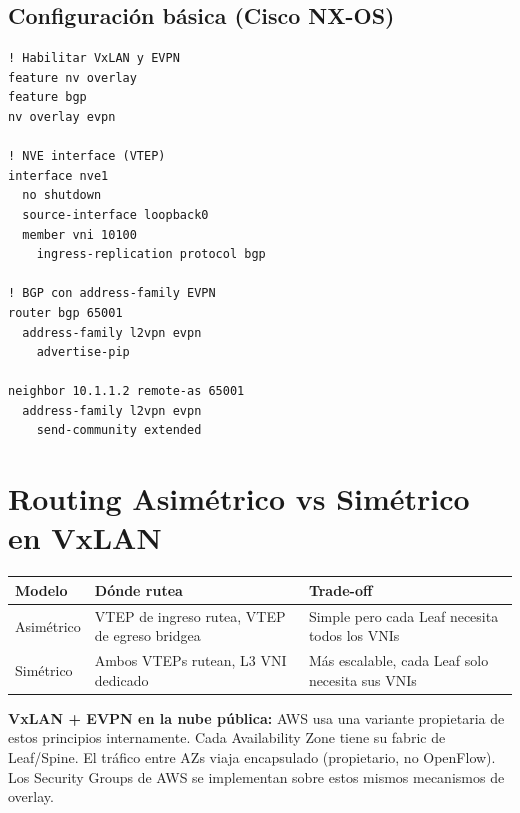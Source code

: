 \subsection{Configuración básica (Cisco NX-OS)}

\begin{codigo}
\begin{lstlisting}
! Habilitar VxLAN y EVPN
feature nv overlay
feature bgp
nv overlay evpn

! NVE interface (VTEP)
interface nve1
  no shutdown
  source-interface loopback0
  member vni 10100
    ingress-replication protocol bgp

! BGP con address-family EVPN
router bgp 65001
  address-family l2vpn evpn
    advertise-pip

neighbor 10.1.1.2 remote-as 65001
  address-family l2vpn evpn
    send-community extended
\end{lstlisting}
\end{codigo}

\section{ Routing Asimétrico vs Simétrico en VxLAN}

\begin{center}
\begin{tabular}{lll}
\toprule
\textbf{Modelo} & \textbf{Dónde rutea} & \textbf{Trade-off} \\
\midrule
Asimétrico & VTEP de ingreso rutea, VTEP de egreso bridgea & Simple pero cada Leaf necesita todos los VNIs \\
Simétrico  & Ambos VTEPs rutean, L3 VNI dedicado           & Más escalable, cada Leaf solo necesita sus VNIs \\
\bottomrule
\end{tabular}
\end{center}

\begin{moderno}
 \textbf{VxLAN + EVPN en la nube pública:} AWS usa una variante propietaria
de estos principios internamente. Cada Availability Zone tiene su fabric de Leaf/Spine.
El tráfico entre AZs viaja encapsulado (propietario, no OpenFlow). Los Security Groups
de AWS se implementan sobre estos mismos mecanismos de overlay.
\end{moderno}
